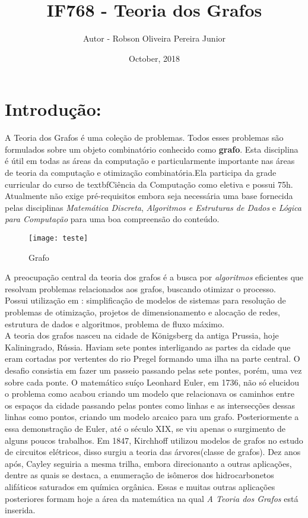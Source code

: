 \documentclass[10pt]{article}
\title{IF768 - Teoria dos Grafos}
\author{Autor - Robson Oliveira Pereira Junior }
\date{October, 2018}
\begin{document}
\maketitle

\section{Introdução:}

 A Teoria dos Grafos é uma coleção de problemas. Todos esses problemas são formulados sobre um objeto combinatório conhecido como \textbf{grafo}.
Esta disciplina é útil em todas as áreas da computação e particularmente importante nas áreas de teoria da computação e otimização combinatória.Ela participa da grade curricular do curso de textbf{Ciência da Computação} como eletiva e possui 75h. Atualmente não exige pré-requisitos embora seja necessária uma base fornecida pelas disciplinas \textit{Matemática Discreta}, \textit{Algoritmos e Estruturas de Dados} e \textit{Lógica para Computação} para uma boa compreensão do conteúdo.\cite{2}\\
\begin{wrapfigure}{l}{0.25\textwidth}
\texttt{[image: teste]} 
\caption{Grafo}
\label{fig:subim1}
\end{wrapfigure}
A preocupação central da teoria dos grafos é a busca por \textit{algoritmos} eficientes que resolvam problemas relacionados aos grafos, buscando otimizar o processo.\\
Possui utilização em : simplificação de modelos de sistemas para resolução de problemas de otimização, projetos de dimensionamento e alocação de redes, estrutura de dados e algoritmos, problema de fluxo máximo.\\
A teoria dos grafos nasceu na cidade de Königsberg da antiga Prussia, hoje Kaliningrado, Rússia. Haviam sete pontes interligando as partes da cidade que eram cortadas por vertentes do rio Pregel formando uma ilha na parte central. O desafio consistia em fazer um passeio passando pelas sete pontes, porém, uma vez sobre cada ponte. O matemático suíço Leonhard Euler, em 1736, não só elucidou o problema como acabou criando um modelo que relacionava os caminhos entre os espaços da cidade passando pelas pontes como linhas e as intersecções dessas linhas como pontos, criando um modelo arcaico para um grafo. Posteriormente a essa demonstração de Euler, até o século XIX, se viu apenas  o surgimento de alguns poucos trabalhos. Em 1847, Kirchhoff utilizou modelos de grafos no estudo de circuitos elétricos, disso surgiu a teoria das árvores(classe de grafos). Dez anos após, Cayley seguiria a mesma trilha, embora direcionanto a outras aplicações, dentre as quais se destaca, a enumeração de isômeros dos hidrocarbonetos alifáticos saturados em química orgânica. Essas e muitas outras aplicações posteriores formam hoje a área da matemática na qual \textit{A Teoria dos Grafos} está inserida.\cite{1}
\end{document}
